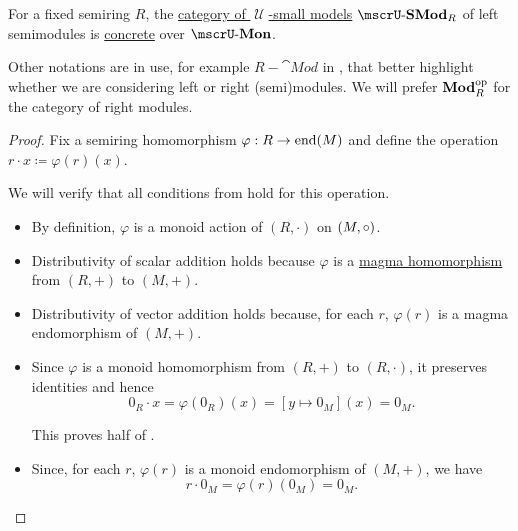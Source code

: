 \begin{definition}
\begin{thmenum}[resume=def:semimodule]
     For a fixed semiring \( R \), the \hyperref[def:category_of_small_first_order_models]{category of \( \mscrU \)-small models} \( \ucat{SMod}_R \) of left semimodules is \hyperref[def:concrete_category]{concrete} over \hyperref[def:monoid]{\( \ucat{Mon} \)}.

    Other notations are in use, for example \( R-\cat{Mod} \) in \cite[158]{Aluffi2009}, that better highlight whether we are considering left or right (semi)modules. We will prefer \( \operatorname{\mathbf{Mod}}_R^{\operatorname{op}} \) for the category of right modules.
  \end{thmenum}
\end{definition}
\begin{proof}
   Fix a semiring homomorphism \( \varphi: R \to \operatorname{end}(M) \) and define the operation \( r \cdot x \coloneqq \varphi(r)(x) \).

  We will verify that all conditions from  hold for this operation.

  \begin{itemize}
    \item By definition, \( \varphi \) is a monoid action of \( (R, \cdot) \) on \( (M, \bincirc) \).

    \item Distributivity of scalar addition holds because \( \varphi \) is a \hyperref[def:magma/homomorphism]{magma homomorphism} from \( (R, +) \) to \( (M, +) \).

    \item Distributivity of vector addition holds because, for each \( r \), \( \varphi(r) \) is a magma endomorphism of \( (M, +) \).

    \item Since \( \varphi \) is a monoid homomorphism from \( (R,  +) \) to \( (R, \cdot) \), it preserves identities and hence
    \begin{equation*}
      0_R \cdot x = \varphi(0_R)(x) = [y \mapsto 0_M](x) = 0_M.
    \end{equation*}

    This proves half of .

    \item Since, for each \( r \), \( \varphi(r) \) is a monoid endomorphism of \( (M, +) \), we have
    \begin{equation*}
      r \cdot 0_M = \varphi(r)(0_M) = 0_M.
    \end{equation*}


\end{itemize}
\end{proof}
